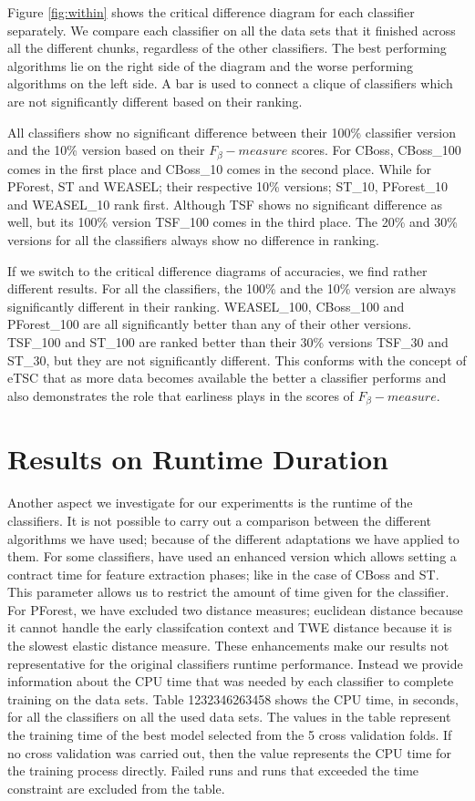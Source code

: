 Figure \ref{fig:within} shows the critical difference diagram for each classifier separately.
We compare each classifier on all the data sets that it finished across all the different chunks, regardless of the other classifiers.
The best performing algorithms lie on the right side of the diagram and the worse performing algorithms on the left side.
A bar is used to connect a clique of classifiers which are not significantly different based on their ranking. 

All classifiers show no significant difference between their 100\% classifier version and the 10\% version based on their $F_{\beta}-measure$ scores.
For CBoss, CBoss\_100 comes in the first place and CBoss\_10 comes in the second place. While for PForest, ST and WEASEL;
their respective 10\% versions; ST\_10, PForest\_10 and WEASEL\_10 rank first.
Although TSF shows no significant difference as well, but its 100\% version TSF\_100 comes in the third place.
The 20\% and 30\% versions for all the classifiers always show no difference in ranking.

If we switch to the critical difference diagrams of accuracies, we find rather different results.
For all the classifiers, the 100\% and the 10\% version are always significantly different in their ranking.
WEASEL\_100, CBoss\_100 and PForest\_100 are all significantly better than any of their other versions.
TSF\_100 and ST\_100 are ranked better than their 30\% versions TSF\_30 and ST\_30, but they are not significantly different.
This conforms with the concept of eTSC that as more data becomes available the better a classifier performs
and also demonstrates the role that earliness plays in the scores of $F_{\beta}-measure$.


\section{Results on Runtime Duration}
\label{SectionRuntime}
Another aspect we investigate for our experimentts is the runtime of the classifiers.
It is not possible to carry out a comparison between the different algorithms we have used; because of the different adaptations we have applied to them.
For some classifiers, have used an enhanced version which allows setting a contract time for feature extraction phases; like in the case of CBoss and ST.
This parameter allows us to restrict the amount of time given for the classifier.
For PForest, we have excluded two distance measures; euclidean distance because it cannot handle the early classifcation context
and TWE distance because it is the slowest elastic distance measure.
These enhancements make our results not representative for the original classifiers runtime performance.
Instead we provide information about the CPU time that was needed by each classifier to complete training on the data sets.
Table 1232346263458 shows the CPU time, in seconds, for all the classifiers on all the used data sets.
The values in the table represent the training time of the best model selected from the 5 cross validation folds.
If no cross validation was carried out, then the value represents the CPU time for the training process directly.
Failed runs and runs that exceeded the time constraint are excluded from the table.

